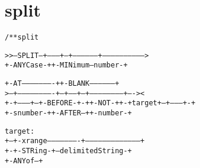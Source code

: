 \section{split}
\begin{shaded}
\begin{alltt}
/** split

   >>--SPLIT--+---------+--+-----------------+----------------------------->
              +-ANYCase-+  +-MINimum--number-+

      +-AT----------------------+           +-BLANK------------------+
   >--+-------------------------+--+-----+--+------------------------+----><
      +-+---------+--+-BEFORE-+-+  +-NOT-+  +-+ target +--+--------+-+
        +-snumber-+  +-AFTER--+                           +-number-+

   target:
   +--+-xrange----------------------+--------------------------------------+
      +-+-STRing-+--delimitedString-+
        +-ANYof--+
\end{alltt}
\end{shaded}
